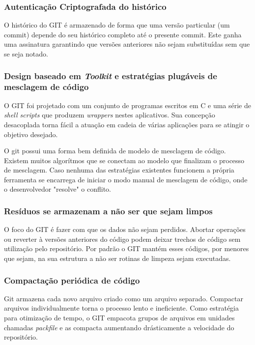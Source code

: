 \documentclass[
	article,			%
	12pt,				%
	oneside,			%
	a4paper,			%
	english,			
	brazil,
	sumario=tradicional
	]{abntex2}
\begin{document}
\subsubsection{Autenticação Criptografada do histórico}
O histórico do GIT é armazenado de forma que uma versão particular (um commit) depende do seu histórico completo até o presente commit. Este ganha uma assinatura garantindo que versões anteriores não sejam substituídas sem que se seja notado.

\subsubsection{Design baseado em \textit{Toolkit} e estratégias plugáveis de mesclagem de código}
O GIT foi projetado com um conjunto de programas escritos em C e uma série de \textit{shell scripts} que produzem \textit{wrappers} nestes aplicativos. Sua concepção desacoplada torna fácil a atuação em cadeia de várias aplicações para se atingir o objetivo desejado.

O git possui uma forma bem definida de modelo de mesclagem de código. Existem muitos algorítmos que se conectam ao modelo que finalizam o processo de mesclagem. Caso nenhuma das estratégias existentes funcionem a própria ferramenta se encarrega de iniciar o modo manual de mesclagem de código, onde o desenvolvedor "resolve" o conflito.

\subsubsection{Resíduos se armazenam a não ser que sejam limpos}
O foco do GIT é fazer com que os dados não sejam perdidos. Abortar operações ou reverter à versões anteriores do código podem deixar trechos de código sem utilização pelo repositório. Por padrão o GIT mantém esses códigos, por menores que sejam, na sua estrutura a não ser rotinas de limpeza sejam executadas.

\subsubsection{Compactação periódica de código}
Git armazena cada novo arquivo criado como um arquivo separado. Compactar arquivos individualmente torna o processo lento e ineficiente. Como estratégia para otimização de tempo, o GIT empacota grupos de arquivos em unidades chamadas \textit{packfile} e as compacta aumentando drásticamente a velocidade do repositório.
\end{document}
